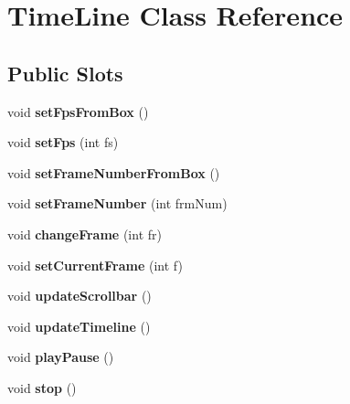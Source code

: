 \hypertarget{class_time_line}{
\section{\-Time\-Line \-Class \-Reference}
\label{class_time_line}
}
\subsection*{\-Public \-Slots}
\begin{DoxyCompactItemize}
\item 
\hypertarget{class_time_line_ab3e5d94ca670f82eacdd027367c9bf91}{
void {\bfseries set\-Fps\-From\-Box} ()}
\label{class_time_line_ab3e5d94ca670f82eacdd027367c9bf91}

\item 
\hypertarget{class_time_line_aaeb0259d5955e4d42365da188d5d9fba}{
void {\bfseries set\-Fps} (int fs)}
\label{class_time_line_aaeb0259d5955e4d42365da188d5d9fba}

\item 
\hypertarget{class_time_line_ad89c70455e4fd0b8085787d85f91ab41}{
void {\bfseries set\-Frame\-Number\-From\-Box} ()}
\label{class_time_line_ad89c70455e4fd0b8085787d85f91ab41}

\item 
\hypertarget{class_time_line_ae5f65d42352ebd2541f78fc1dca1ac56}{
void {\bfseries set\-Frame\-Number} (int frm\-Num)}
\label{class_time_line_ae5f65d42352ebd2541f78fc1dca1ac56}

\item 
\hypertarget{class_time_line_a816d4bd74233fd141e073af605943c42}{
void {\bfseries change\-Frame} (int fr)}
\label{class_time_line_a816d4bd74233fd141e073af605943c42}

\item 
\hypertarget{class_time_line_af98fb8d92cf5267a805df86ee7eb5cb3}{
void {\bfseries set\-Current\-Frame} (int f)}
\label{class_time_line_af98fb8d92cf5267a805df86ee7eb5cb3}

\item 
\hypertarget{class_time_line_a452aefbf2e8afb2def50b0b7501281e9}{
void {\bfseries update\-Scrollbar} ()}
\label{class_time_line_a452aefbf2e8afb2def50b0b7501281e9}

\item 
\hypertarget{class_time_line_a8a1d5709fafac88eaae5351872e0c265}{
void {\bfseries update\-Timeline} ()}
\label{class_time_line_a8a1d5709fafac88eaae5351872e0c265}

\item 
\hypertarget{class_time_line_a3991d169565633b9d157730b082ef345}{
void {\bfseries play\-Pause} ()}
\label{class_time_line_a3991d169565633b9d157730b082ef345}

\item 
\hypertarget{class_time_line_a2ffd05e0854bc69c37a06a445bae3727}{
void {\bfseries stop} ()}
\label{class_time_line_a2ffd05e0854bc69c37a06a445bae3727}

\end{DoxyCompactItemize}
